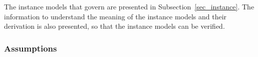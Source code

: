 \documentclass[12pt]{article}
\begin{document}


The instance models that govern \progname{} are presented in
Subsection~\ref{sec_instance}.  The information to understand the meaning of the
instance models and their derivation is also presented, so that the instance
models can be verified.






\subsubsection{Assumptions} \label{sec_assumpt}

\end{document}

